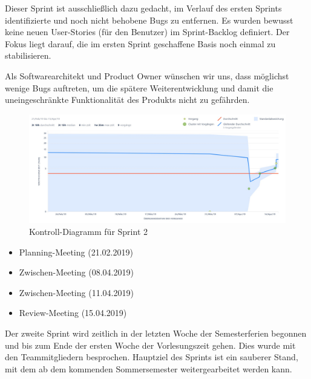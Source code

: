Dieser Sprint ist ausschließlich dazu gedacht, im Verlauf des ersten Sprints identifizierte und noch nicht behobene Bugs zu entfernen. Es wurden bewusst keine neuen User-Stories (für den Benutzer) im Sprint-Backlog definiert. Der Fokus liegt darauf, die im ersten Sprint geschaffene Basis noch einmal zu stabilisieren.
\nsecend

Als Softwarearchitekt und Product Owner wünschen wir uns, dass möglichst wenige Bugs auftreten, um die spätere Weiterentwicklung und damit die uneingeschränkte Funktionalität des Produkts nicht zu gefährden.
\nsecend
\nsecend %

\begin{figure}[hbtp]
\centering
\includegraphics[width=\textwidth]{Bilder/diagram_sprint2}
\caption{Kontroll-Diagramm für Sprint 2}
\end{figure}
\nsecend%

\begin{itemize}
\item Planning-Meeting (21.02.2019)
\item Zwischen-Meeting (08.04.2019)
\item Zwischen-Meeting (11.04.2019)
\item Review-Meeting (15.04.2019)
\end{itemize}
\nsecend%

Der zweite Sprint wird zeitlich in der letzten Woche der Semesterferien begonnen und bis zum Ende der ersten Woche der Vorlesungszeit gehen. Dies wurde mit den Teammitgliedern besprochen. Hauptziel des Sprints ist ein sauberer Stand, mit dem ab dem kommenden Sommersemester weitergearbeitet werden kann.
\nsecend

